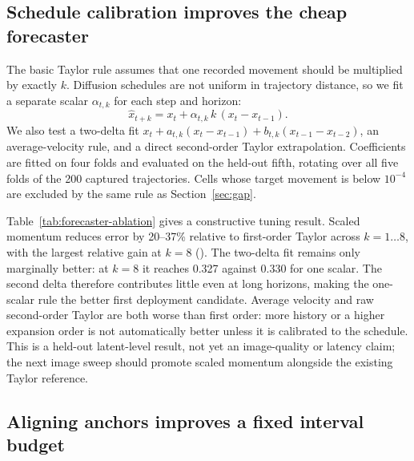 \documentclass[11pt,a4paper]{article}
\newcommand{\relltwo}{\ensuremath{\mathrm{relL2}}}
\begin{document}
\subsection{Schedule calibration improves the cheap forecaster}
\label{sec:calibration}

The basic Taylor rule assumes that one recorded movement should be multiplied
by exactly $k$. Diffusion schedules are not uniform in trajectory distance, so
we fit a separate scalar $\alpha_{t,k}$ for each step and horizon:
\begin{equation}
  \hat{x}_{t+k}=x_t+\alpha_{t,k}\,k\,(x_t-x_{t-1}).
\end{equation}
We also test a two-delta fit
$x_t+a_{t,k}(x_t-x_{t-1})+b_{t,k}(x_{t-1}-x_{t-2})$, an average-velocity
rule, and a direct second-order Taylor extrapolation. Coefficients are fitted on
four folds and evaluated on the held-out fifth, rotating over all five folds of
the 200 captured trajectories. Cells whose target movement is below $10^{-4}$
are excluded by the same rule as Section~\ref{sec:gap}.

\begin{table}[ht]
\centering
\scriptsize

\caption{Five-fold held-out \relltwo{} (mean $\pm$ standard deviation across
folds). Lower is better. Scaled momentum fits one schedule scalar;
two-delta fits two. No image pixels or timing labels enter the fit.}
\label{tab:forecaster-ablation}
\end{table}

Table~\ref{tab:forecaster-ablation} gives a constructive tuning result. Scaled
momentum reduces error by 20--37\% relative to first-order Taylor across
$k=1\ldots8$, with the largest relative gain at $k=8$
(\LongHorizonImprovement{}). The two-delta fit remains only marginally better:
at $k=8$ it reaches 0.327 against 0.330 for one scalar. The second delta
therefore contributes little even at long horizons, making the one-scalar rule
the better first deployment candidate.
Average velocity and raw second-order Taylor are both worse than first order:
more history or a higher expansion order is not automatically better unless it
is calibrated to the schedule. This is a held-out latent-level result, not yet
an image-quality or latency claim; the next image sweep should promote scaled
momentum alongside the existing Taylor reference.

\subsection{Aligning anchors improves a fixed interval budget}
\label{sec:aligned-schedule}
\end{document}
